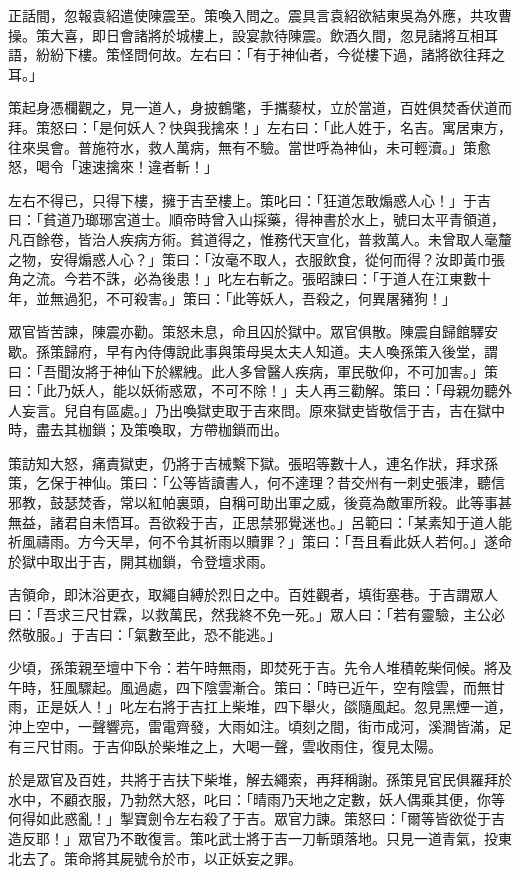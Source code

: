 正話間，忽報袁紹遣使陳震至。策喚入問之。震具言袁紹欲結東吳為外應，共攻曹操。策大喜，即日會諸將於城樓上，設宴款待陳震。飲酒久間，忽見諸將互相耳語，紛紛下樓。策怪問何故。左右曰：「有于神仙者，今從樓下過，諸將欲往拜之耳。」

策起身憑欄觀之，見一道人，身披鶴氅，手攜藜杖，立於當道，百姓俱焚香伏道而拜。策怒曰：「是何妖人？快與我擒來！」左右曰：「此人姓于，名吉。寓居東方，往來吳會。普施符水，救人萬病，無有不驗。當世呼為神仙，未可輕瀆。」策愈怒，喝令「速速擒來！違者斬！」

左右不得已，只得下樓，擁于吉至樓上。策叱曰：「狂道怎敢煽惑人心！」于吉曰：「貧道乃瑯琊宮道士。順帝時曾入山採藥，得神書於水上，號曰太平青領道，凡百餘卷，皆治人疾病方術。貧道得之，惟務代天宣化，普救萬人。未曾取人毫釐之物，安得煽惑人心？」策曰：「汝毫不取人，衣服飲食，從何而得？汝即黃巾張角之流。今若不誅，必為後患！」叱左右斬之。張昭諫曰：「于道人在江東數十年，並無過犯，不可殺害。」策曰：「此等妖人，吾殺之，何異屠豬狗！」

眾官皆苦諫，陳震亦勸。策怒未息，命且囚於獄中。眾官俱散。陳震自歸館驛安歇。孫策歸府，早有內侍傳說此事與策母吳太夫人知道。夫人喚孫策入後堂，謂曰：「吾聞汝將于神仙下於縲絏。此人多曾醫人疾病，軍民敬仰，不可加害。」策曰：「此乃妖人，能以妖術惑眾，不可不除！」夫人再三勸解。策曰：「母親勿聽外人妄言。兒自有區處。」乃出喚獄吏取于吉來問。原來獄吏皆敬信于吉，吉在獄中時，盡去其枷鎖；及策喚取，方帶枷鎖而出。

策訪知大怒，痛責獄吏，仍將于吉械繫下獄。張昭等數十人，連名作狀，拜求孫策，乞保于神仙。策曰：「公等皆讀書人，何不達理？昔交州有一刺史張津，聽信邪教，鼓瑟焚香，常以紅帕裏頭，自稱可助出軍之威，後竟為敵軍所殺。此等事甚無益，諸君自未悟耳。吾欲殺于吉，正思禁邪覺迷也。」呂範曰：「某素知于道人能祈風禱雨。方今天旱，何不令其祈雨以贖罪？」策曰：「吾且看此妖人若何。」遂命於獄中取出于吉，開其枷鎖，令登壇求雨。

吉領命，即沐浴更衣，取繩自縛於烈日之中。百姓觀者，填街塞巷。于吉謂眾人曰：「吾求三尺甘霖，以救萬民，然我終不免一死。」眾人曰：「若有靈驗，主公必然敬服。」于吉曰：「氣數至此，恐不能逃。」

少頃，孫策親至壇中下令：若午時無雨，即焚死于吉。先令人堆積乾柴伺候。將及午時，狂風驟起。風過處，四下陰雲漸合。策曰：「時已近午，空有陰雲，而無甘雨，正是妖人！」叱左右將于吉扛上柴堆，四下舉火，燄隨風起。忽見黑煙一道，沖上空中，一聲響亮，雷電齊發，大雨如注。頃刻之間，街市成河，溪澗皆滿，足有三尺甘雨。于吉仰臥於柴堆之上，大喝一聲，雲收雨住，復見太陽。

於是眾官及百姓，共將于吉扶下柴堆，解去繩索，再拜稱謝。孫策見官民俱羅拜於水中，不顧衣服，乃勃然大怒，叱曰：「晴雨乃天地之定數，妖人偶乘其便，你等何得如此惑亂！」掣寶劍令左右殺了于吉。眾官力諫。策怒曰：「爾等皆欲從于吉造反耶！」眾官乃不敢復言。策叱武士將于吉一刀斬頭落地。只見一道青氣，投東北去了。策命將其屍號令於市，以正妖妄之罪。

